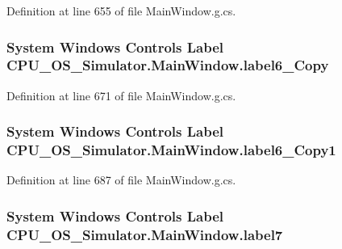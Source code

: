 Definition at line 655 of file Main\+Window.\+g.\+cs.

\hypertarget{class_c_p_u___o_s___simulator_1_1_main_window_a18612502a8ab2d53d85434e426785022}{}
\subsubsection[{label6\+\_\+\+Copy}]{\setlength{\rightskip}{0pt plus 5cm}System Windows Controls Label C\+P\+U\+\_\+\+O\+S\+\_\+\+Simulator.\+Main\+Window.\+label6\+\_\+\+Copy\hspace{0.3cm}{\ttfamily [package]}}\label{class_c_p_u___o_s___simulator_1_1_main_window_a18612502a8ab2d53d85434e426785022}


Definition at line 671 of file Main\+Window.\+g.\+cs.

\hypertarget{class_c_p_u___o_s___simulator_1_1_main_window_a890bd54d36af19ec881b6a840d6ac8a9}{}
\subsubsection[{label6\+\_\+\+Copy1}]{\setlength{\rightskip}{0pt plus 5cm}System Windows Controls Label C\+P\+U\+\_\+\+O\+S\+\_\+\+Simulator.\+Main\+Window.\+label6\+\_\+\+Copy1\hspace{0.3cm}{\ttfamily [package]}}\label{class_c_p_u___o_s___simulator_1_1_main_window_a890bd54d36af19ec881b6a840d6ac8a9}


Definition at line 687 of file Main\+Window.\+g.\+cs.

\hypertarget{class_c_p_u___o_s___simulator_1_1_main_window_a38ed6363fd03954967bda7a099f6b07e}{}
\subsubsection[{label7}]{\setlength{\rightskip}{0pt plus 5cm}System Windows Controls Label C\+P\+U\+\_\+\+O\+S\+\_\+\+Simulator.\+Main\+Window.\+label7\hspace{0.3cm}{\ttfamily [package]}}\label{class_c_p_u___o_s___simulator_1_1_main_window_a38ed6363fd03954967bda7a099f6b07e}


